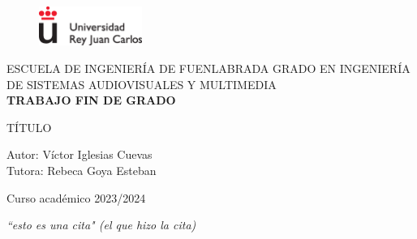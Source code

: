 \documentclass[12pt,a4paper,Spanish]{article}
\begin{document}
\renewcommand{\listtablename}{Índice de tablas} 


\begin{titlepage}
\begin{center}
\begin{figure}
	\centering
\includegraphics[width=0.3\textwidth]{./figs/logoURJC}
\end{figure}
\begin{center}
\large
ESCUELA DE INGENIERÍA DE FUENLABRADA
\vspace*{0.15in}
GRADO EN INGENIERÍA DE SISTEMAS AUDIOVISUALES Y MULTIMEDIA \\
\vspace*{0.6in}
{\large \bf TRABAJO FIN DE GRADO}\\
\end{center}
\vspace*{0.2in}
{\large
{TÍTULO} \\
}
\vspace*{0.3in}
\vspace*{0.3in}
\vspace*{0.1in}
\end{center}
{\large
Autor: Víctor Iglesias Cuevas  \\[0.2cm]
Tutora: Rebeca Goya Esteban \\[0.15cm]
}
\vspace*{0.1in}
\vspace*{0.1in}
\begin{center}Curso académico 2023/2024\end{center}
\end{titlepage}


\newpage
\thispagestyle{empty} %
\begin{flushright}
	\vspace*{5cm}
 	\textit{“esto es una cita" (el que hizo la cita)}
\end{flushright}





\newpage
\thispagestyle{plain}
\end{document}
